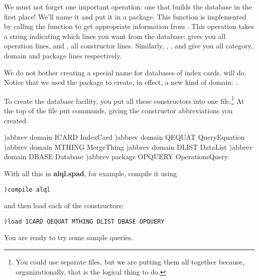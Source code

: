 {{{{{{{We must not forget one important operation: one that builds the database in the
first place!
We'll name it  and put it in a package.
This function is implemented by calling the \Lisp{} function
 to get appropriate information from
\Browse{}.
This operation takes a string indicating which lines you
want from the database:  gives you all operation
lines, and , all constructor lines.
Similarly, , , and  give
you all category, domain and package lines respectively.
%

We do not bother creating a special name for databases of index
cards.
 will do.
Notice that we used the package  to
create, in effect,
a new kind of domain: .


To create the database facility, you put all these constructors
into one file.\footnote{You could use separate files, but we
are putting them all together because, organizationally, that is
the logical thing to do.}
At the top of the file put  commands, giving the
constructor abbreviations you created.

\begin{xmpLines}
)abbrev domain  ICARD   IndexCard
)abbrev domain  QEQUAT  QueryEquation
)abbrev domain  MTHING  MergeThing
)abbrev domain  DLIST   DataList
)abbrev domain  DBASE   Database
)abbrev package OPQUERY OperationsQuery
\end{xmpLines}

With all this in {\bf alql.spad}, for example, compile it using
\begin{verbatim}
)compile alql
\end{verbatim}
and then load each of the constructors:
\begin{verbatim}
)load ICARD QEQUAT MTHING DLIST DBASE OPQUERY
\end{verbatim}
You are ready to try some sample queries.

}}}}}}}
